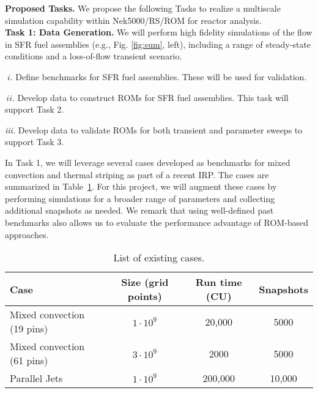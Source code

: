 \noindent
\textbf{Proposed Tasks.}
We propose the following Tasks to realize a multiscale simulation
capability within Nek5000/RS/ROM for reactor analysis.
\\[-1ex]

\noindent
\textbf{Task 1: Data Generation.} We will perform high fidelity simulations of 
the flow in SFR fuel assemblies (e.g., Fig. \ref{fig:sum}, left), including 
a range of steady-state conditions and a loss-of-flow transient scenario.
\\[-3ex]
\begin{description}
\item{$\; i.$}
Define benchmarks for SFR fuel assemblies. These will be used for validation.
\\[-4ex]
\item{$\, ii.$}
Develop data to construct ROMs for SFR fuel assemblies. This
task will support Task 2.  
\\[-4ex]
\item{\em iii.} Develop data to validate ROMs for both
transient and parameter sweeps to support Task 3.
\\[-3ex]
\end{description}
In Task 1, we will leverage several cases developed as benchmarks for mixed
convection and thermal striping as part of a recent IRP. The cases are
summarized in Table~\ref{tab:cases}. For this project, we will augment these
cases by performing simulations for a broader range of parameters and
collecting additional snapshots as needed. We remark that using well-defined
past benchmarks also allows us to evaluate the performance advantage of
ROM-based approaches. \\[-2ex]

\begin{table}
\centering
\begin{tabular}{|l|c|c|c|}
\hline
\textbf{Case} & \textbf{Size} (grid points) & \textbf{Run time} (CU) & \textbf{Snapshots} \\\hline
Mixed convection (19 pins) \cite{kraus22}& $1\cdot 10^{9}$ & 20,000 & 5000 \\
\hline
Mixed convection (61 pins) \cite{kraus22}& $3\cdot 10^{9}$ & 2000 &  5000 \\
\hline
Parallel Jets \cite{acierno22}& $1\cdot 10^{9}$ & 200,000 & 10,000 \\
\hline
\end{tabular}
\caption{\label{tab:cases} List of existing cases.}
\end{table}

